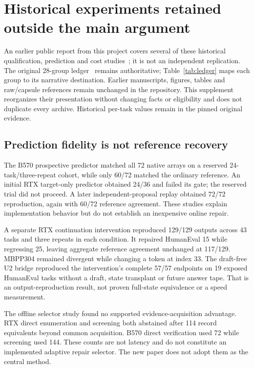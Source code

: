 \section{Historical experiments retained outside the main argument}
\label{supp:history}
An earlier public report from this project covers several of these historical qualification, prediction and cost studies~\cite{previousreport}; it is not an independent replication. The original 28-group ledger~\cite{history} remains authoritative; Table~\ref{tab:ledger} maps each group to its narrative destination. Earlier manuscripts, figures, tables and raw/capsule references remain unchanged in the repository. This supplement reorganizes their presentation without changing facts or eligibility and does not duplicate every archive. Historical per-task values remain in the pinned original evidence.

\subsection{Prediction fidelity is not reference recovery}
The B570 prospective predictor matched all 72 native arrays on a reserved 24-task/three-repeat cohort, while only 60/72 matched the ordinary reference. An initial RTX target-only predictor obtained 24/36 and failed its gate; the reserved trial did not proceed. A later independent-proposal replay obtained 72/72 reproduction, again with 60/72 reference agreement. These studies explain implementation behavior but do not establish an inexpensive online repair.

A separate RTX continuation intervention reproduced 129/129 outputs across 43 tasks and three repeats in each condition. It repaired HumanEval 15 while regressing 25, leaving aggregate reference agreement unchanged at 117/129. MBPP304 remained divergent while changing a token at index 33. The draft-free U2 bridge reproduced the intervention's complete 57/57 endpoints on 19 exposed HumanEval tasks without a draft, state transplant or future answer tape. That is an output-reproduction result, not proven full-state equivalence or a speed measurement.

The offline selector study found no supported evidence-acquisition advantage. RTX direct enumeration and screening both abstained after 114 record equivalents beyond common acquisition. B570 direct verification used 72 while screening used 144. These counts are not latency and do not constitute an implemented adaptive repair selector. The new paper does not adopt them as the central method.

